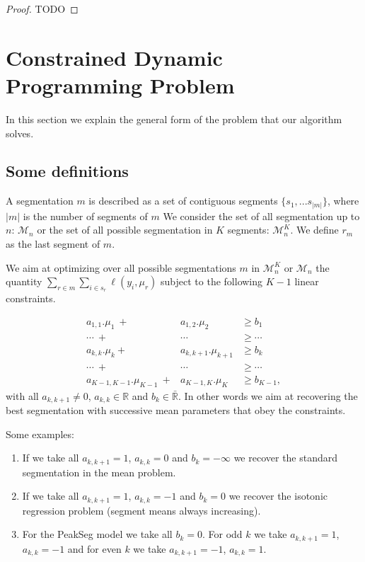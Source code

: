 \documentclass{article}
\begin{document}
\begin{proof}
  TODO
\end{proof}

\newcommand{\FCC}{\widetilde{C}}
\newcommand{\M}{\mathcal{M}}
\section{Constrained Dynamic Programming Problem}

In this section we explain the general form of the problem that our algorithm solves.

\subsection{Some definitions}

A segmentation $m$ is described as a set of contiguous segments $\{s_1, ... s_{|m|} \}$, where $|m|$ is the number of segments of $m$
We consider the set of all segmentation up to $n$: $\M_n$ 
or the set of all possible segmentation in $K$ segments: $\M^K_n$.
We define $r_m$ as the last segment of $m$.

We aim at optimizing over all possible segmentations $m$ in $\M^K_n$ or $\M_n$
 the quantity
$\sum_{r \in m} \sum_{i \in s_{r}} \ell(y_i, \mu_{r})$ subject to
the following $K-1$ linear constraints. 

\begin{eqnarray*}
a_{1,1}.\mu_1 \ + & a_{1,2}.\mu_2  & \geq  b_1 \\
\cdots \ +&  \cdots & \geq \cdots \\
a_{k,k}.\mu_{k} + & a_{k,k+1}.\mu_{k+1}  & \geq  b_{k} \\
\cdots \ +&  \cdots & \geq \cdots  \\
a_{K-1,K-1}.\mu_{K-1} \ +& a_{K-1,K}.\mu_K & \geq  b_{K-1},
\end{eqnarray*}
with all $a_{k,k+1} \neq 0$, $a_{k,k} \in \mathbb{R}$ and
$b_{k} \in \bar{\mathbb{R}}.$ In other words we aim at recovering the
best segmentation with successive mean parameters that obey the
constraints.

Some examples:
\begin{enumerate}
\item If we take all $a_{k,k+1} =1$, $a_{k,k}=0$ and $b_{k} = - \infty$ we recover the standard segmentation in the mean problem.
\item If we take all $a_{k,k+1} =1$, $a_{k,k}=-1$ and $b_{k} = 0$ we
  recover the isotonic regression problem (segment means always
  increasing).
\item For the PeakSeg model we take all $b_{k} = 0$. For odd $k$ we
  take $a_{k,k+1} =1$, $a_{k,k}=-1$ and for even $k$ we take
  $a_{k,k+1} =-1$, $a_{k,k}=1$.
\end{enumerate}
\end{document}
